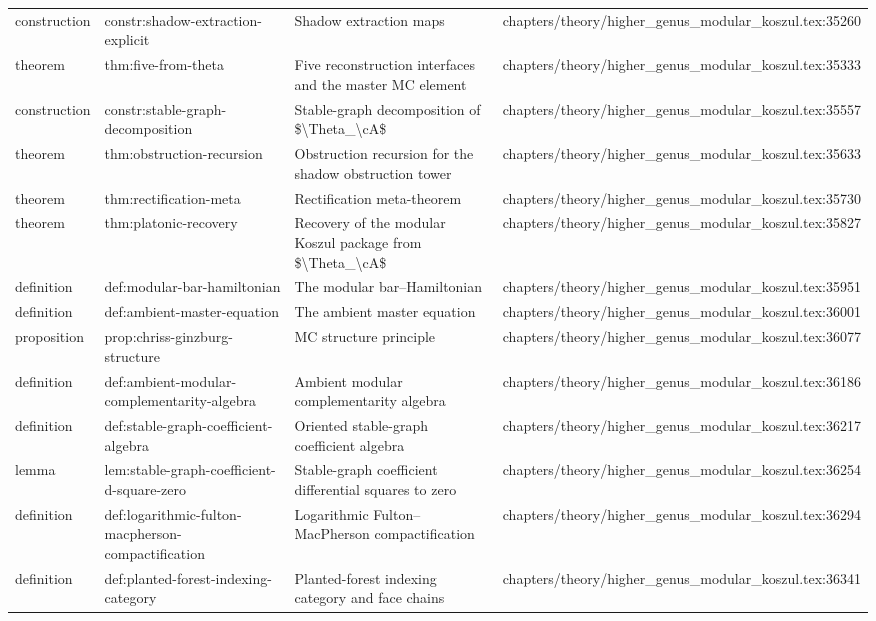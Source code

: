 \documentclass[11pt]{article}
\begin{document}
\begin{longtable}{L{0.10\textwidth}L{0.26\textwidth}L{0.42\textwidth}L{0.22\textwidth}}
construction & constr:shadow-extraction-explicit & Shadow extraction maps & chapters/theory/higher\_genus\_modular\_koszul.tex:35260\\
theorem & thm:five-from-theta & Five reconstruction interfaces and the master MC element & chapters/theory/higher\_genus\_modular\_koszul.tex:35333\\
construction & constr:stable-graph-decomposition & Stable-graph decomposition of \$\textbackslash{}Theta\_\textbackslash{}cA\$ & chapters/theory/higher\_genus\_modular\_koszul.tex:35557\\
theorem & thm:obstruction-recursion & Obstruction recursion for the shadow obstruction tower & chapters/theory/higher\_genus\_modular\_koszul.tex:35633\\
theorem & thm:rectification-meta & Rectification meta-theorem & chapters/theory/higher\_genus\_modular\_koszul.tex:35730\\
theorem & thm:platonic-recovery & Recovery of the modular Koszul package from \$\textbackslash{}Theta\_\textbackslash{}cA\$ & chapters/theory/higher\_genus\_modular\_koszul.tex:35827\\
definition & def:modular-bar-hamiltonian & The modular bar--Hamiltonian & chapters/theory/higher\_genus\_modular\_koszul.tex:35951\\
definition & def:ambient-master-equation & The ambient master equation & chapters/theory/higher\_genus\_modular\_koszul.tex:36001\\
proposition & prop:chriss-ginzburg-structure & MC structure principle & chapters/theory/higher\_genus\_modular\_koszul.tex:36077\\
definition & def:ambient-modular-complementarity-algebra & Ambient modular complementarity algebra & chapters/theory/higher\_genus\_modular\_koszul.tex:36186\\
definition & def:stable-graph-coefficient-algebra & Oriented stable-graph coefficient algebra & chapters/theory/higher\_genus\_modular\_koszul.tex:36217\\
lemma & lem:stable-graph-coefficient-d-square-zero & Stable-graph coefficient differential squares to zero & chapters/theory/higher\_genus\_modular\_koszul.tex:36254\\
definition & def:logarithmic-fulton-macpherson-compactification & Logarithmic Fulton--MacPherson compactification & chapters/theory/higher\_genus\_modular\_koszul.tex:36294\\
definition & def:planted-forest-indexing-category & Planted-forest indexing category and face chains & chapters/theory/higher\_genus\_modular\_koszul.tex:36341\\

\end{longtable}
\end{document}
